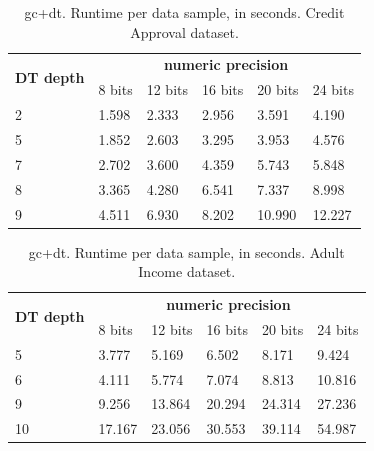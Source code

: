 \begin{table}[htp]
\centering
\caption{\acs{gc}+\acs{dt}. Runtime per data sample, in seconds. Credit Approval dataset.}
\label{table:runtimeDTCA}
\begin{tabular}{|l|l|l|l|l|l|}
\hline
\multirow{2}{*}{\textbf{DT depth}} & \multicolumn{5}{c|}{\textbf{numeric precision}}         \\ \cline{2-6} 
                          & 8 bits & 12 bits & 16 bits & 20 bits & 24 bits \\ \hline
2                         & 1.598  & 2.333   & 2.956   & 3.591   & 4.190   \\ \hline
5                         & 1.852  & 2.603   & 3.295   & 3.953   & 4.576   \\ \hline
7                         & 2.702  & 3.600   & 4.359   & 5.743   & 5.848   \\ \hline
8                         & 3.365  & 4.280   & 6.541   & 7.337   & 8.998   \\ \hline
9                         & 4.511  & 6.930   & 8.202   & 10.990  & 12.227  \\ \hline
\end{tabular}
\end{table}


\begin{table}[htp]
\centering
\caption{\acs{gc}+\acs{dt}. Runtime per data sample, in seconds. Adult Income dataset.}
\label{table:runtimeDTAI}
\begin{tabular}{|l|l|l|l|l|l|}
\hline
\multirow{2}{*}{\textbf{DT depth}} & \multicolumn{5}{c|}{\textbf{numeric precision}}         \\ \cline{2-6} 
                          & 8 bits & 12 bits & 16 bits & 20 bits & 24 bits \\ \hline
5                         & 3.777  & 5.169   & 6.502   & 8.171   & 9.424   \\ \hline
6                         & 4.111  & 5.774   & 7.074   & 8.813   & 10.816  \\ \hline
9                         & 9.256  & 13.864  & 20.294  & 24.314  & 27.236  \\ \hline
10                        & 17.167 & 23.056  & 30.553  & 39.114  & 54.987  \\ \hline
\end{tabular}
\end{table}



